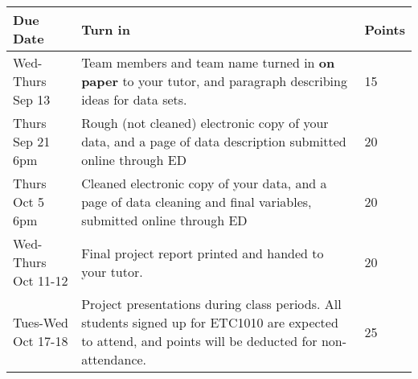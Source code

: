 \documentclass{article}
\begin{document}
\begin{center}
\bigskip
\begin{tabular}{l|p{10cm}|l}
  {\bf Due Date} & {\bf Turn in}  & {\bf Points} \\\hline
  Wed-Thurs Sep 13 & Team members and team name turned in {\bf on paper} to your tutor, and paragraph describing ideas for data sets. 
  & 15\\\hline
 Thurs Sep 21 6pm & Rough (not cleaned) electronic copy of your data, and a page of data description submitted online through ED & 20 \\\hline
  
 Thurs Oct 5 6pm & Cleaned electronic copy of your data, and a page of data cleaning and final variables, submitted online through ED & 20\\\hline
 Wed-Thurs Oct 11-12 & Final project report printed and handed to your tutor. & 20 \\\hline
  Tues-Wed Oct 17-18 & Project presentations during class periods. All students signed up for ETC1010 are expected to attend, and points will be deducted for non-attendance. & 25\\\hline
\end{tabular}
\end{center}
\bigskip
\end{document}
